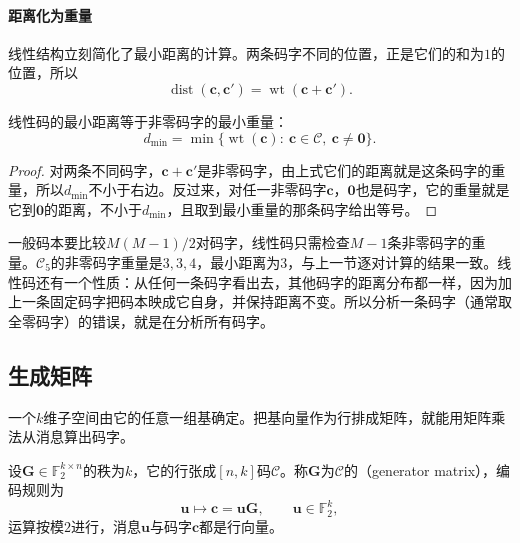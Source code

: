 \paragraph{距离化为重量}
线性结构立刻简化了最小距离的计算。两条码字不同的位置，正是它们的和为$1$的位置，所以
\[
 \operatorname{dist}(\bm{c},\bm{c}')=\operatorname{wt}(\bm{c}+\bm{c}') .
\]

\begin{lemma}[线性码的最小距离]
\label{lem:ccode-min-weight}
线性码的最小距离等于非零码字的最小重量：
\begin{equation}
 d_{\min}=\min\{\operatorname{wt}(\bm{c}):\ \bm{c}\in\mathcal{C},\ \bm{c}\neq\bm{0}\} .
 \label{eq:ccode-min-weight}
\end{equation}
\end{lemma}

\begin{proof}
对两条不同码字，$\bm{c}+\bm{c}'$是非零码字，由上式它们的距离就是这条码字的重量，所以$d_{\min}$不小于右边。反过来，对任一非零码字$\bm{c}$，$\bm{0}$也是码字，它的重量就是它到$\bm{0}$的距离，不小于$d_{\min}$，且取到最小重量的那条码字给出等号。
\end{proof}

一般码本要比较$M(M-1)/2$对码字，线性码只需检查$M-1$条非零码字的重量。$\mathcal{C}_5$的非零码字重量是$3,3,4$，最小距离为$3$，与上一节逐对计算的结果一致。线性码还有一个性质：从任何一条码字看出去，其他码字的距离分布都一样，因为加上一条固定码字把码本映成它自身，并保持距离不变。所以分析一条码字（通常取全零码字）的错误，就是在分析所有码字。

\subsection{生成矩阵}
\label{sec:ccode-generator}

一个$k$维子空间由它的任意一组基确定。把基向量作为行排成矩阵，就能用矩阵乘法从消息算出码字。

\begin{definition}[生成矩阵]
\label{def:ccode-generator}
设$\bm{G}\in\mathbb{F}_2^{k\times n}$的秩为$k$，它的行张成$[n,k]$码$\mathcal{C}$。称$\bm{G}$为$\mathcal{C}$的（generator matrix），编码规则为
\begin{equation}
 \bm{u}\mapsto\bm{c}=\bm{u}\bm{G},\qquad \bm{u}\in\mathbb{F}_2^{k},
 \label{eq:ccode-encode}
\end{equation}
运算按模$2$进行，消息$\bm{u}$与码字$\bm{c}$都是行向量。
\end{definition}

